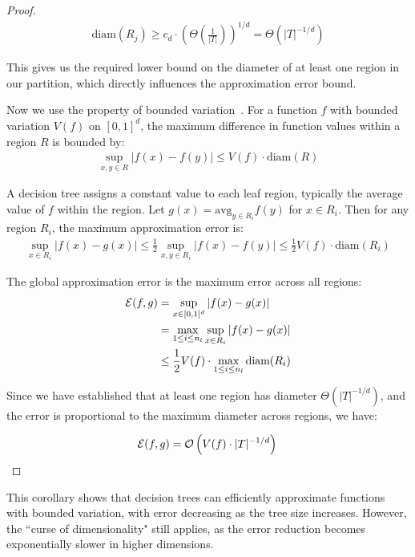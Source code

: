 \documentclass[11pt,letter,leqno]{article}
\begin{document}
\begin{proof}
\begin{align}
  \text{diam}(R_j) \geq c_d \cdot \left(\Theta\left(\frac{1}{|T|}\right)\right)^{1/d} = \Theta\left(|T|^{-1/d}\right)
\end{align}

This gives us the required lower bound on the diameter of at least one region in our partition, which directly influences the approximation error bound.

Now we use the property of bounded variation~\cite{Breneis2020}.  For a function $f$ with bounded variation $V(f)$ on $[0,1]^d$, the maximum difference in function values within a region $R$ is bounded by:
\begin{align}
\sup_{x,y \in R} |f(x) - f(y)| \leq V(f) \cdot \text{diam}(R)
\end{align}

A decision tree assigns a constant value to each leaf region, typically the average value of $f$ within the region.  Let $g(x) = \text{avg}_{y \in R_i} f(y)$ for $x \in R_i$.  Then for any region $R_i$, the maximum approximation error is:
\begin{align}
\sup_{x \in R_i} |f(x) - g(x)| \leq \frac{1}{2} \sup_{x,y \in R_i} |f(x) - f(y)| \leq \frac{1}{2} V(f) \cdot \text{diam}(R_i)
\end{align}

The global approximation error is the maximum error across all regions:
\begin{align}
\mathcal{E}(f, g) &= \sup_{x \in [0,1]^d} |f(x) - g(x)| \notag \\
&= \max_{1 \leq i \leq n_l} \sup_{x \in R_i} |f(x) - g(x)| \notag \\
&\leq \frac{1}{2} V(f) \cdot \max_{1 \leq i \leq n_l} \text{diam}(R_i)
\end{align}

Since we have established that at least one region has diameter $\Theta\left(|T|^{-1/d}\right)$, and the error is proportional to the maximum diameter across regions, we have:

\[ \mathcal{E}(f, g) = \mathcal{O}\left(V(f) \cdot |T|^{-1/d}\right) \qedhere \]

\end{proof}

This corollary shows that decision trees can efficiently approximate functions with bounded variation, with error decreasing as the tree size increases.  However, the ``curse of dimensionality" still applies, as the error reduction becomes exponentially slower in higher dimensions.
\end{document}
